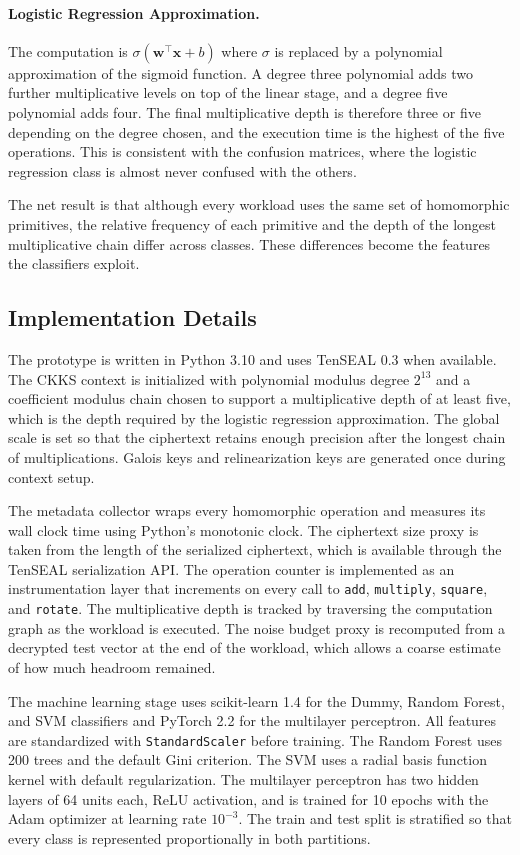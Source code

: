 \documentclass[12pt,a4paper]{article}
\begin{document}
\paragraph{Logistic Regression Approximation.} The computation is $\sigma(\mathbf{w}^\top \mathbf{x} + b)$ where $\sigma$ is replaced by a polynomial approximation of the sigmoid function. A degree three polynomial adds two further multiplicative levels on top of the linear stage, and a degree five polynomial adds four. The final multiplicative depth is therefore three or five depending on the degree chosen, and the execution time is the highest of the five operations. This is consistent with the confusion matrices, where the logistic regression class is almost never confused with the others.

The net result is that although every workload uses the same set of homomorphic primitives, the relative frequency of each primitive and the depth of the longest multiplicative chain differ across classes. These differences become the features the classifiers exploit.

\subsection{Implementation Details}
The prototype is written in Python 3.10 and uses TenSEAL 0.3 when available. The CKKS context is initialized with polynomial modulus degree $2^{13}$ and a coefficient modulus chain chosen to support a multiplicative depth of at least five, which is the depth required by the logistic regression approximation. The global scale is set so that the ciphertext retains enough precision after the longest chain of multiplications. Galois keys and relinearization keys are generated once during context setup.

The metadata collector wraps every homomorphic operation and measures its wall clock time using Python's monotonic clock. The ciphertext size proxy is taken from the length of the serialized ciphertext, which is available through the TenSEAL serialization API. The operation counter is implemented as an instrumentation layer that increments on every call to \texttt{add}, \texttt{multiply}, \texttt{square}, and \texttt{rotate}. The multiplicative depth is tracked by traversing the computation graph as the workload is executed. The noise budget proxy is recomputed from a decrypted test vector at the end of the workload, which allows a coarse estimate of how much headroom remained.

The machine learning stage uses scikit-learn 1.4 for the Dummy, Random Forest, and SVM classifiers and PyTorch 2.2 for the multilayer perceptron. All features are standardized with \texttt{StandardScaler} before training. The Random Forest uses 200 trees and the default Gini criterion. The SVM uses a radial basis function kernel with default regularization. The multilayer perceptron has two hidden layers of 64 units each, ReLU activation, and is trained for 10 epochs with the Adam optimizer at learning rate $10^{-3}$. The train and test split is stratified so that every class is represented proportionally in both partitions.
\end{document}
